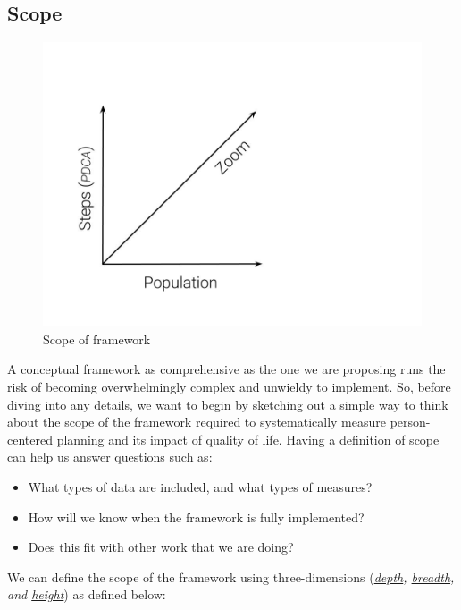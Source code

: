 \documentclass[
]{book}
\providecommand{\tightlist}{%
  \setlength{\itemsep}{0pt}\setlength{\parskip}{0pt}}
\begin{document}
\hypertarget{scope}{%
\subsection{Scope}\label{scope}}

\begin{figure}
\includegraphics[width=24in]{_bookdown_files/img/QoL Framework Scope} \caption{Scope of framework}\label{fig:unnamed-chunk-9}
\end{figure}

A conceptual framework as comprehensive as the one we are proposing runs the risk of becoming overwhelmingly complex and unwieldy to implement. So, before diving into any details, we want to begin by sketching out a simple way to think about the scope of the framework required to systematically measure person-centered planning and its impact of quality of life. Having a definition of scope can help us answer questions such as:

\begin{itemize}
\tightlist
\item
  What types of data are included, and what types of measures?\\
\item
  How will we know when the framework is fully implemented?\\
\item
  Does this fit with other work that we are doing?
\end{itemize}

We can define the scope of the framework using three-dimensions (\emph{\protect\hyperlink{zoom}{depth}, \protect\hyperlink{pop}{breadth}, and \protect\hyperlink{steps}{height}}) as defined below:
\end{document}
